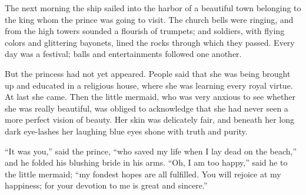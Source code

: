 The next morning the ship sailed into the harbor of a beautiful town belonging to the king whom the prince was going to visit.
The church bells were ringing, and from the high towers sounded a flourish of trumpets; and soldiers, with flying colors and glittering bayonets, lined the rocks through which they passed.
Every day was a festival; balls and entertainments followed one another.

But the princess had not yet appeared.
People said that she was being brought up and educated in a religious house, where she was learning every royal virtue.
At last she came.
Then the little mermaid, who was very anxious to see whether she was really beautiful, was obliged to acknowledge that she had never seen a more perfect vision of beauty.
Her skin was delicately fair, and beneath her long dark eye-lashes her laughing blue eyes shone with truth and purity.

``It was you,'' said the prince, ``who saved my life when I lay dead on the beach,'' and he folded his blushing bride in his arms.
``Oh, I am too happy,'' said he to the little mermaid; ``my fondest hopes are all fulfilled.
You will rejoice at my happiness; for your devotion to me is great and sincere.''

